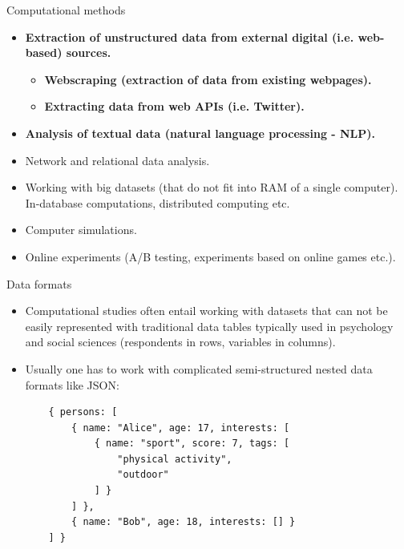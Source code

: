 \documentclass{beamer}
\begin{document}
\begin{frame}{Computational methods}
\begin{itemize}
    \item \textbf{Extraction of unstructured data from external digital (i.e. web-based)
    sources.}
    \begin{itemize}
        \item \textbf{Webscraping (extraction of data from existing webpages).}
        \item \textbf{Extracting data from web APIs (i.e. Twitter).}
    \end{itemize}
    \item \textbf{Analysis of textual data (natural language processing - NLP).}
    \item Network and relational data analysis.
    \item Working with big datasets (that do not fit into RAM of a single computer).
    In-database computations, distributed computing etc.
    \item Computer simulations.
    \item Online experiments (A/B testing, experiments based on online games etc.).
\end{itemize}
\end{frame}

\begin{frame}[fragile]{Data formats}
\begin{itemize}
    \item Computational studies often entail working with datasets that
    can not be easily represented with traditional data tables typically
    used in psychology and social sciences
    (respondents in rows, variables in columns).
    \item Usually one has to work with complicated semi-structured nested
    data formats like JSON:
    \begin{small}
    \begin{verbatim}
    { persons: [
        { name: "Alice", age: 17, interests: [
            { name: "sport", score: 7, tags: [
                "physical activity",
                "outdoor"
            ] }
        ] },
        { name: "Bob", age: 18, interests: [] }
    ] }
    \end{verbatim}
    \end{small}
\end{itemize}
\end{frame}
\end{document}
